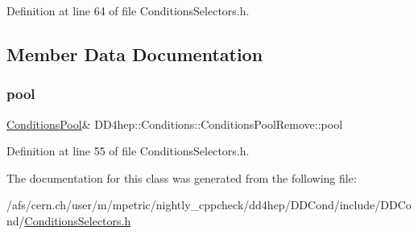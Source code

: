 Definition at line 64 of file Conditions\+Selectors.\+h.



\subsection{Member Data Documentation}
\hypertarget{class_d_d4hep_1_1_conditions_1_1_conditions_pool_remove_a8db5c24da51ce1a590146387c3ab0c3b}{}\label{class_d_d4hep_1_1_conditions_1_1_conditions_pool_remove_a8db5c24da51ce1a590146387c3ab0c3b} 
\subsubsection{\texorpdfstring{pool}{pool}}
{\footnotesize\ttfamily \hyperlink{class_d_d4hep_1_1_conditions_1_1_conditions_pool}{Conditions\+Pool}\& D\+D4hep\+::\+Conditions\+::\+Conditions\+Pool\+Remove\+::pool\hspace{0.3cm}{\ttfamily [private]}}



Definition at line 55 of file Conditions\+Selectors.\+h.



The documentation for this class was generated from the following file\+:\begin{DoxyCompactItemize}
\item 
/afs/cern.\+ch/user/m/mpetric/nightly\+\_\+cppcheck/dd4hep/\+D\+D\+Cond/include/\+D\+D\+Cond/\hyperlink{_conditions_selectors_8h}{Conditions\+Selectors.\+h}\end{DoxyCompactItemize}
